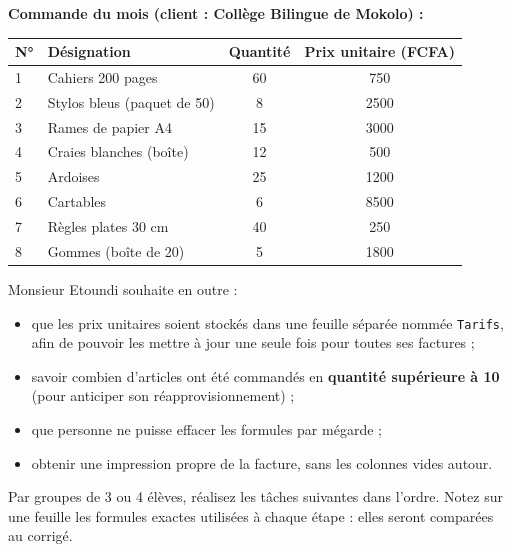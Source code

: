 \documentclass[11pt]{article}
\newcounter{popsec}
\newcounter{popsub}
\newcommand{\courssub}[1]{%
  \stepcounter{popsub}%
  \par\vspace{9pt}\noindent{\popxbold\fontsize{11.5}{13}\selectfont\color{popink}{\color{poporange}\thepopsec.\thepopsub}\hspace{6pt}#1}\par\nopagebreak\vspace{4pt}
}
\begin{document}
\textbf{Commande du mois (client : Collège Bilingue de Mokolo) :}

\begin{center}
\begin{tabularx}{\linewidth}{|l|X|c|c|}
\hline
\rowcolor{popblueL} \textbf{N°} & \textbf{Désignation} & \textbf{Quantité} & \textbf{Prix unitaire (FCFA)} \\
\hline
1 & Cahiers 200 pages & 60 & 750 \\
\hline
2 & Stylos bleus (paquet de 50) & 8 & 2500 \\
\hline
3 & Rames de papier A4 & 15 & 3000 \\
\hline
4 & Craies blanches (boîte) & 12 & 500 \\
\hline
5 & Ardoises & 25 & 1200 \\
\hline
6 & Cartables & 6 & 8500 \\
\hline
7 & Règles plates 30 cm & 40 & 250 \\
\hline
8 & Gommes (boîte de 20) & 5 & 1800 \\
\hline
\end{tabularx}
\end{center}

Monsieur Etoundi souhaite en outre :

\begin{itemize}
\item que les prix unitaires soient stockés dans une feuille séparée nommée \texttt{Tarifs}, afin de pouvoir les mettre à jour une seule fois pour toutes ses factures ;
\item savoir combien d'articles ont été commandés en \textbf{quantité supérieure à 10} (pour anticiper son réapprovisionnement) ;
\item que personne ne puisse effacer les formules par mégarde ;
\item obtenir une impression propre de la facture, sans les colonnes vides autour.
\end{itemize}

\courssub{Consignes}

Par groupes de 3 ou 4 élèves, réalisez les tâches suivantes dans l'ordre. Notez sur une feuille les formules exactes utilisées à chaque étape : elles seront comparées au corrigé.
\end{document}
